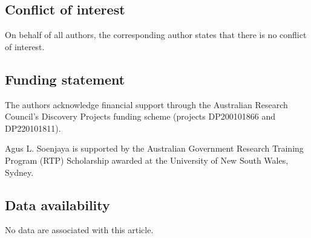 \documentclass[11pt, reqno]{amsart}
\theoremstyle{definition}
\numberwithin{equation}{section}
\begin{document}
\subsection*{Conflict of interest}
On behalf of all authors, the corresponding author states that there is no conflict of interest.


\subsection*{Funding statement}
The authors acknowledge financial support through the Australian Research Council's Discovery Projects funding scheme (projects DP200101866 and DP220101811).

Agus L. Soenjaya is supported by the Australian Government Research Training Program (RTP) Scholarship awarded at the University of New South Wales, Sydney.


\subsection*{Data availability}
No data are associated with this article.




%
%
\end{document}
